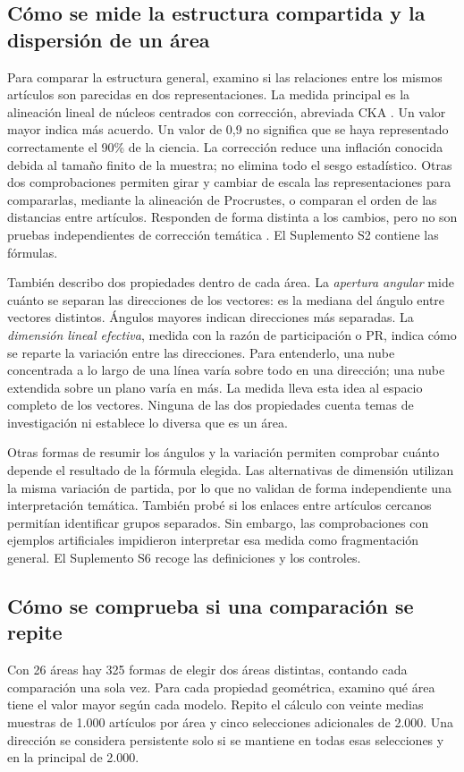 \documentclass[12pt]{article}
\begin{document}
\subsection{Cómo se mide la estructura compartida y la dispersión de un área}
Para comparar la estructura general, examino si las relaciones entre los mismos artículos son parecidas en dos representaciones. La medida principal es la alineación lineal de núcleos centrados con corrección, abreviada CKA \citep{pmlr-v97-kornblith19a,refa961d84a4e}. Un valor mayor indica más acuerdo. Un valor de 0,9 no significa que se haya representado correctamente el 90\% de la ciencia. La corrección reduce una inflación conocida debida al tamaño finito de la muestra; no elimina todo el sesgo estadístico. Otras dos comprobaciones permiten girar y cambiar de escala las representaciones para compararlas, mediante la alineación de Procrustes, o comparan el orden de las distancias entre artículos. Responden de forma distinta a los cambios, pero no son pruebas independientes de corrección temática \citep{NEURIPS2021_252a3dba,pmlr-v285-williams24a}. El Suplemento S2 contiene las fórmulas.

También describo dos propiedades dentro de cada área. La \emph{apertura angular} mide cuánto se separan las direcciones de los vectores: es la mediana del ángulo entre vectores distintos. Ángulos mayores indican direcciones más separadas. La \emph{dimensión lineal efectiva}, medida con la razón de participación o PR, indica cómo se reparte la variación entre las direcciones. Para entenderlo, una nube concentrada a lo largo de una línea varía sobre todo en una dirección; una nube extendida sobre un plano varía en más. La medida lleva esta idea al espacio completo de los vectores. Ninguna de las dos propiedades cuenta temas de investigación ni establece lo diversa que es un área.

Otras formas de resumir los ángulos y la variación permiten comprobar cuánto depende el resultado de la fórmula elegida. Las alternativas de dimensión utilizan la misma variación de partida, por lo que no validan de forma independiente una interpretación temática. También probé si los enlaces entre artículos cercanos permitían identificar grupos separados. Sin embargo, las comprobaciones con ejemplos artificiales impidieron interpretar esa medida como fragmentación general. El Suplemento S6 recoge las definiciones y los controles.

\subsection{Cómo se comprueba si una comparación se repite}
Con 26 áreas hay 325 formas de elegir dos áreas distintas, contando cada comparación una sola vez. Para cada propiedad geométrica, examino qué área tiene el valor mayor según cada modelo. Repito el cálculo con veinte medias muestras de 1.000 artículos por área y cinco selecciones adicionales de 2.000. Una dirección se considera persistente solo si se mantiene en todas esas selecciones y en la principal de 2.000.
\end{document}
